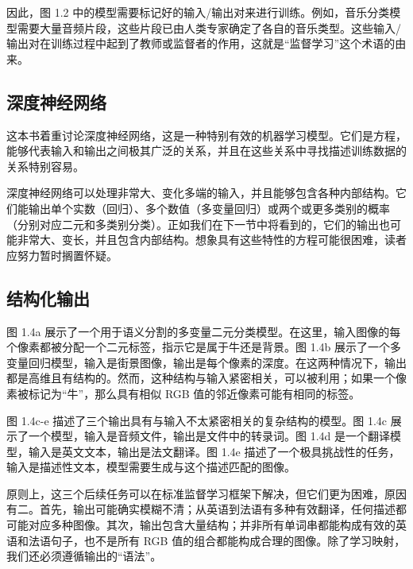 \documentclass[lang=cn,newtx,10pt,scheme=chinese]{elegantbook}
\begin{document}
因此，图 1.2 中的模型需要标记好的输入/输出对来进行训练。例如，音乐分类模型需要大量音频片段，这些片段已由人类专家确定了各自的音乐类型。这些输入/输出对在训练过程中起到了教师或监督者的作用，这就是“监督学习”这个术语的由来。

\subsection{深度神经网络}
这本书着重讨论深度神经网络，这是一种特别有效的机器学习模型。它们是方程，能够代表输入和输出之间极其广泛的关系，并且在这些关系中寻找描述训练数据的关系特别容易。

深度神经网络可以处理非常大、变化多端的输入，并且能够包含各种内部结构。它们能输出单个实数（回归）、多个数值（多变量回归）或两个或更多类别的概率（分别对应二元和多类别分类）。正如我们在下一节中将看到的，它们的输出也可能非常大、变长，并且包含内部结构。想象具有这些特性的方程可能很困难，读者应努力暂时搁置怀疑。

\subsection{结构化输出}
图 1.4a 展示了一个用于语义分割的多变量二元分类模型。在这里，输入图像的每个像素都被分配一个二元标签，指示它是属于牛还是背景。图 1.4b 展示了一个多变量回归模型，输入是街景图像，输出是每个像素的深度。在这两种情况下，输出都是高维且有结构的。然而，这种结构与输入紧密相关，可以被利用；如果一个像素被标记为“牛”，那么具有相似 RGB 值的邻近像素可能有相同的标签。

图 1.4c-e 描述了三个输出具有与输入不太紧密相关的复杂结构的模型。图 1.4c 展示了一个模型，输入是音频文件，输出是文件中的转录词。图 1.4d 是一个翻译模型，输入是英文文本，输出是法文翻译。图 1.4e 描述了一个极具挑战性的任务，输入是描述性文本，模型需要生成与这个描述匹配的图像。

原则上，这三个后续任务可以在标准监督学习框架下解决，但它们更为困难，原因有二。首先，输出可能确实模糊不清；从英语到法语有多种有效翻译，任何描述都可能对应多种图像。其次，输出包含大量结构；并非所有单词串都能构成有效的英语和法语句子，也不是所有 RGB 值的组合都能构成合理的图像。除了学习映射，我们还必须遵循输出的“语法”。
\end{document}
